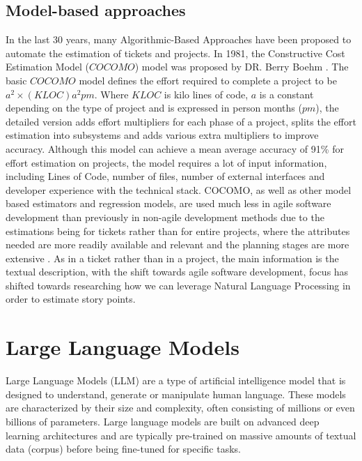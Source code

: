 \documentclass{UoYCSproject}
\begin{document}
    \subsection{Model-based approaches}\label{subsec:model-based-approaches}
    In the last 30 years, many Algorithmic-Based Approaches have been proposed to automate the estimation of tickets
    and projects.
    In 1981, the Constructive Cost Estimation Model ($COCOMO$) model was proposed by DR. Berry Boehm \cite{Boehm2001}.
    The basic $COCOMO$ model defines the effort required to complete a project to be $a^2 \times (KLOC)a^2pm$.
    Where $KLOC$ is kilo lines of code, $a$ is a constant depending on the type of project and is expressed in person months ($pm$), the detailed version adds effort multipliers for each phase of a project, splits the effort estimation into subsystems and adds various extra multipliers to improve accuracy.
    Although this model can achieve a mean average accuracy of 91\% for effort estimation on projects, the model requires a lot of input information, including Lines of Code, number of files, number of external interfaces and developer experience with the technical stack.
    COCOMO, as well as other model based estimators and regression models, are used much less in agile software development than previously in non-agile development methods due to the estimations being for tickets rather than for entire projects, where the attributes needed are more readily available and relevant and the planning stages are more extensive \cite{effortestimationsurvey}.
    As in a ticket rather than in a project, the main information is the textual description, with the shift towards agile software development, focus has shifted towards researching how we can leverage Natural Language Processing in order to estimate story points.


    \section{Large Language Models}
    \label{sec:large-language-models}
    Large Language Models (LLM) are a type of artificial intelligence model that is designed to understand, generate
    or manipulate human language.
    These models are characterized by their size and complexity, often consisting of millions or even billions of parameters.
    Large language models are built on advanced deep learning architectures and are typically pre-trained on massive amounts of textual data (corpus) before being fine-tuned for specific tasks. \par
\end{document}

